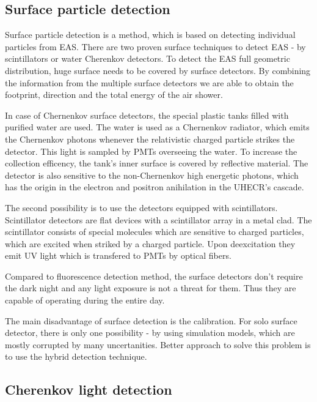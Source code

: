 \subsection{Surface particle detection}
Surface particle detection is a method, which is based on detecting individual particles from EAS. There are two proven surface techniques to detect EAS - by scintillators or water Cherenkov detectors. To detect the EAS full geometric distribution, huge surface needs to be covered by surface detectors. By combining the information from the multiple surface detectors we are able to obtain the footprint, direction and the total energy of the air shower.
\par
In case of Chernenkov surface detectors, the special plastic tanks filled with purified water are used. The water is used as a Chernenkov radiator, which emits the Chernenkov photons whenever the relativistic charged particle strikes the detector. This light is sampled by PMTs overseeing the water.
To increase the collection efficency, the tank's inner surface is covered by reflective material. The detector is also sensitive to the non-Chernenkov high energetic photons, which has the origin in the electron and positron anihilation in the UHECR's cascade.
\par
The second possibility is to use the detectors equipped with scintillators. Scintillator detectors are flat devices with a scintillator array in a metal clad. The scintillator consists of special molecules which are sensitive to charged particles, which are excited when striked by a charged particle. Upon deexcitation they emit UV light which is transfered to PMTs by optical fibers.
\par
Compared to fluorescence detection method, the surface detectors don't require the dark night and any light exposure is not a threat for them. Thus they are capable of operating during the entire day. 

\par
The main disadvantage of surface detection is the calibration. For solo surface detector, there is only one possibility - by using simulation models, which are mostly corrupted by many uncertanities. Better approach to solve this problem is to use the hybrid detection technique.


\subsection{Cherenkov light detection}


